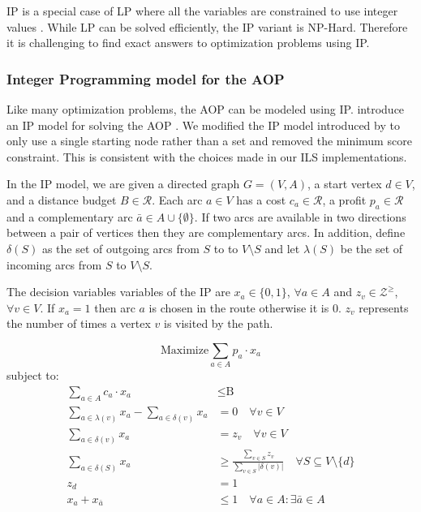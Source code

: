 \documentclass[honors]{union-cs-thesis}
\newcommand{\RR}{\mathcal{R}} %
\newcommand{\ZZ}{\mathcal{Z}} %
\newcommand{\set}[1]{\ensuremath{\{{#1}\}}} %
\newcommand{\sse}{\subseteq} %
\begin{document}
IP is a special case of LP where all the variables are constrained to use integer values \cite{ibm-int-programming}. While LP can be solved efficiently, the IP variant is NP-Hard. Therefore it is challenging to find exact answers to optimization problems using IP.

\subsubsection{Integer Programming model for the AOP}
Like many optimization problems, the AOP can be modeled using IP. \citeauthor{verbeeck2014extension} introduce an IP model for solving the AOP \cite{verbeeck2014extension}. We modified the IP model introduced by \citeauthor{verbeeck2014extension} to only use a single starting node rather than a set and removed the minimum score constraint. This is consistent with the choices made in our ILS implementations.

In the IP model, we are given a directed graph $G = (V,A)$, a start vertex $d \in V$, and a distance budget $B \in \RR$. Each arc $a \in V$ has a cost $c_a \in \RR$, a profit $p_a \in \RR$ and a complementary arc $\bar{a} \in A \cup \set{\emptyset}$. If two arcs are available in two directions between a pair of vertices then they are complementary arcs. In addition, define $\delta(S)$ as the set of outgoing arcs from $S$ to to $V \setminus S$ and let $\lambda(S)$ be the set of incoming arcs from $S$ to $V \setminus S$.

The decision variables variables of the IP are $x_a \in \set{0,1}$, $\forall a \in A$ and $z_v \in \ZZ^{\geq}$, $\forall v \in V$. If $x_a = 1$ then arc $a$ is chosen in the route otherwise it is 0. $z_v$ represents the number of times a vertex $v$ is visited by the path.

\begin{minipage}{\textwidth}
\begin{equation*}
    \text{Maximize} \sum_{a \in A}{p_a \cdot x_a}
\end{equation*}
subject to:
\begin{align}
\sum_{a \in A}{c_a \cdot x_a} &\leq \text{B} \label{eq:ip-cost}\\
\sum_{a \in \lambda(v)}{x_a}  -\sum_{a \in \delta(v)}{x_a} &= 0 \quad \forall v \in V\label{eq:ip-flow}\\
\sum_{a \in \delta(v)}{x_a} &= z_v \quad\forall v \in V \label{eq:ip-vertex}\\
\sum_{a \in \delta(S)}{x_a} &\geq \frac{\sum_{v \in S}{z_v}}{\sum_{v \in S}{|\delta(v)|}} \quad \forall S \sse V \setminus \set{d} \label{eq:ip-subtour}\\
z_d &= 1\label{eq:ip-start}\\
x_a + x_{\bar{a}} &\leq 1 \quad \forall a \in A: \exists\bar{a} \in A\label{eq:ip-complement}
\end{align}
\end{minipage}
\end{document}
